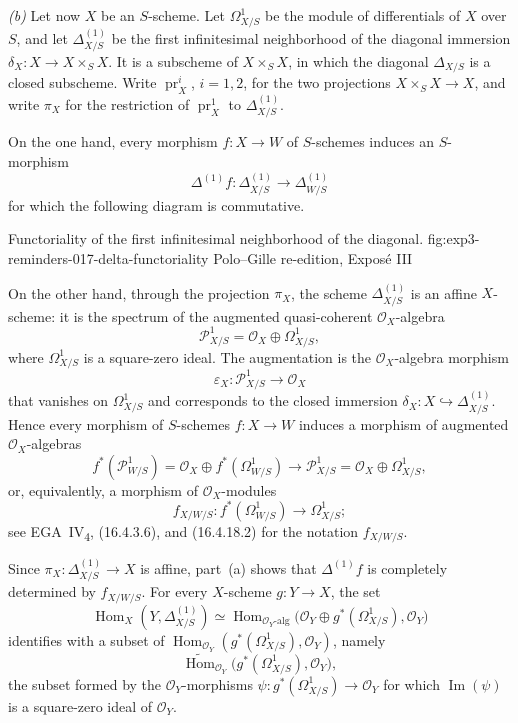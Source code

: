 \smallskip
\noindent{}\textit{(b)} Let now \(X\) be an \(S\)-scheme. Let
\(\Omega^1_{X/S}\) be the module of differentials of \(X\) over \(S\),
and let \(\Delta^{(1)}_{X/S}\) be the first infinitesimal neighborhood
of the diagonal immersion
\(\delta_X:X\to X\times_S X\). It is a subscheme of
\(X\times_S X\), in which the diagonal \(\Delta_{X/S}\) is a closed
subscheme. Write \(\operatorname{pr}^i_X\), \(i=1,2\), for the two
projections \(X\times_S X\to X\), and write \(\pi_X\) for the
restriction of \(\operatorname{pr}^1_X\) to
\(\Delta^{(1)}_{X/S}\).

On the one hand, every morphism \(f:X\to W\) of \(S\)-schemes induces
an \(S\)-morphism
\[
 \Delta^{(1)}f:\Delta^{(1)}_{X/S}\longrightarrow
 \Delta^{(1)}_{W/S}
\]
for which the following diagram is commutative.

  {Functoriality of the first infinitesimal neighborhood of the diagonal.}
  {fig:exp3-reminders-017-delta-functoriality}
  {Polo--Gille re-edition, Expos\'e III}

On the other hand, through the projection \(\pi_X\), the scheme
\(\Delta^{(1)}_{X/S}\) is an affine \(X\)-scheme: it is the spectrum
of the augmented quasi-coherent \(\mathscr O_X\)-algebra
\[
 \mathscr P^1_{X/S}=\mathscr O_X\oplus\Omega^1_{X/S},
\]
where \(\Omega^1_{X/S}\) is a square-zero ideal. The augmentation is
the \(\mathscr O_X\)-algebra morphism
\[
 \varepsilon_X:\mathscr P^1_{X/S}\longrightarrow\mathscr O_X
\]
that vanishes on \(\Omega^1_{X/S}\) and corresponds to the closed
immersion \(\delta_X:X\hookrightarrow\Delta^{(1)}_{X/S}\). Hence every
morphism of \(S\)-schemes \(f:X\to W\) induces a morphism of augmented
\(\mathscr O_X\)-algebras
\[
 f^*(\mathscr P^1_{W/S})
 =\mathscr O_X\oplus f^*(\Omega^1_{W/S})
 \longrightarrow
 \mathscr P^1_{X/S}=\mathscr O_X\oplus\Omega^1_{X/S},
\]
or, equivalently, a morphism of \(\mathscr O_X\)-modules
\[
 f_{X/W/S}:f^*(\Omega^1_{W/S})\longrightarrow\Omega^1_{X/S};
\]
see EGA~IV\textsubscript{4}, (16.4.3.6), and (16.4.18.2) for the
notation \(f_{X/W/S}\).

Since \(\pi_X:\Delta^{(1)}_{X/S}\to X\) is affine, part~(a) shows
that \(\Delta^{(1)}f\) is completely determined by \(f_{X/W/S}\).
For every \(X\)-scheme \(g:Y\to X\), the set
\[
 \operatorname{Hom}_X(Y,\Delta^{(1)}_{X/S})
 \simeq
 \operatorname{Hom}_{\mathscr O_Y\text{-}\mathrm{alg}}
 \bigl(\mathscr O_Y\oplus g^*(\Omega^1_{X/S}),\mathscr O_Y\bigr)
\]
identifies with a subset of
\(\operatorname{Hom}_{\mathscr O_Y}
 (g^*(\Omega^1_{X/S}),\mathscr O_Y)\), namely
\[
 \widetilde{\operatorname{Hom}}_{\mathscr O_Y}
 \bigl(g^*(\Omega^1_{X/S}),\mathscr O_Y\bigr),
\]
the subset formed by the \(\mathscr O_Y\)-morphisms
\(\psi:g^*(\Omega^1_{X/S})\to\mathscr O_Y\) for which
\(\operatorname{Im}(\psi)\) is a square-zero ideal of
\(\mathscr O_Y\).

